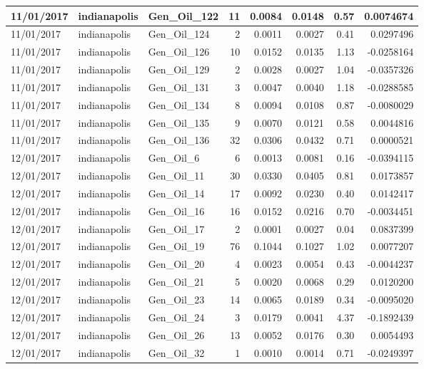 \documentclass[
  letterpaper,
  DIV=11,
  numbers=noendperiod]{scrartcl}
\begin{document}
\begin{tabular}{l|l|l|r|r|r|r|r}
\hline
11/01/2017 & indianapolis & Gen\_Oil\_122 & 11 & 0.0084 & 0.0148 & 0.57 & 0.0074674\\
\hline
11/01/2017 & indianapolis & Gen\_Oil\_124 & 2 & 0.0011 & 0.0027 & 0.41 & 0.0297496\\
\hline
11/01/2017 & indianapolis & Gen\_Oil\_126 & 10 & 0.0152 & 0.0135 & 1.13 & -0.0258164\\
\hline
11/01/2017 & indianapolis & Gen\_Oil\_129 & 2 & 0.0028 & 0.0027 & 1.04 & -0.0357326\\
\hline
11/01/2017 & indianapolis & Gen\_Oil\_131 & 3 & 0.0047 & 0.0040 & 1.18 & -0.0288585\\
\hline
11/01/2017 & indianapolis & Gen\_Oil\_134 & 8 & 0.0094 & 0.0108 & 0.87 & -0.0080029\\
\hline
11/01/2017 & indianapolis & Gen\_Oil\_135 & 9 & 0.0070 & 0.0121 & 0.58 & 0.0044816\\
\hline
11/01/2017 & indianapolis & Gen\_Oil\_136 & 32 & 0.0306 & 0.0432 & 0.71 & 0.0000521\\
\hline
12/01/2017 & indianapolis & Gen\_Oil\_6 & 6 & 0.0013 & 0.0081 & 0.16 & -0.0394115\\
\hline
12/01/2017 & indianapolis & Gen\_Oil\_11 & 30 & 0.0330 & 0.0405 & 0.81 & 0.0173857\\
\hline
12/01/2017 & indianapolis & Gen\_Oil\_14 & 17 & 0.0092 & 0.0230 & 0.40 & 0.0142417\\
\hline
12/01/2017 & indianapolis & Gen\_Oil\_16 & 16 & 0.0152 & 0.0216 & 0.70 & -0.0034451\\
\hline
12/01/2017 & indianapolis & Gen\_Oil\_17 & 2 & 0.0001 & 0.0027 & 0.04 & 0.0837399\\
\hline
12/01/2017 & indianapolis & Gen\_Oil\_19 & 76 & 0.1044 & 0.1027 & 1.02 & 0.0077207\\
\hline
12/01/2017 & indianapolis & Gen\_Oil\_20 & 4 & 0.0023 & 0.0054 & 0.43 & -0.0044237\\
\hline
12/01/2017 & indianapolis & Gen\_Oil\_21 & 5 & 0.0020 & 0.0068 & 0.29 & 0.0120200\\
\hline
12/01/2017 & indianapolis & Gen\_Oil\_23 & 14 & 0.0065 & 0.0189 & 0.34 & -0.0095020\\
\hline
12/01/2017 & indianapolis & Gen\_Oil\_24 & 3 & 0.0179 & 0.0041 & 4.37 & -0.1892439\\
\hline
12/01/2017 & indianapolis & Gen\_Oil\_26 & 13 & 0.0052 & 0.0176 & 0.30 & 0.0054493\\
\hline
12/01/2017 & indianapolis & Gen\_Oil\_32 & 1 & 0.0010 & 0.0014 & 0.71 & -0.0249397\\

\end{tabular}
\end{document}
